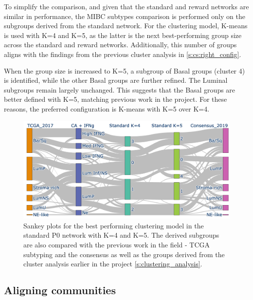 To simplify the comparison, and given that the standard and reward networks are similar in performance, the MIBC subtypes comparison is performed only on the subgroups derived from the standard network. For the clustering model, K-means is used with K=4 and K=5, as the latter is the next best-performing group size across the standard and reward networks. Additionally, this number of groups aligns with the findings from the previous cluster analysis in \cref{s:cs:right_config}.

When the group size is increased to K=5, a subgroup of Basal groups (cluster 4) is identified, while the other Basal groups are further refined. The Luminal subgroups remain largely unchanged. This suggests that the Basal groups are better defined with K=5, matching previous work in the project. For these reasons, the preferred configuration is K-means with K=5 over K=4.



\begin{figure}[!htb]
    \centering
    \includegraphics[width=\textwidth,keepaspectratio]{Sections/Network_I/Resources/P0/clustering/Sankey_KM_4K_v3.png}
    \caption[P0 network derived clusters comparisons with others]{Sankey plots for the best performing clustering model in the standard P0 network with K=4 and K=5. The derived subgroups are also compared with the previous work in the field - TCGA subtyping \citep{Robertson2017-mg} and the consensus \citet{Kamoun2020-tj} as well as the groups derived from the cluster analysis earlier in the project \cref{s:clustering_analysis}. }
    \label{fig:N_I:p0_sky_KMeans}
\end{figure}





\subsection{Aligning communities} \label{s:ap:align_coms}

